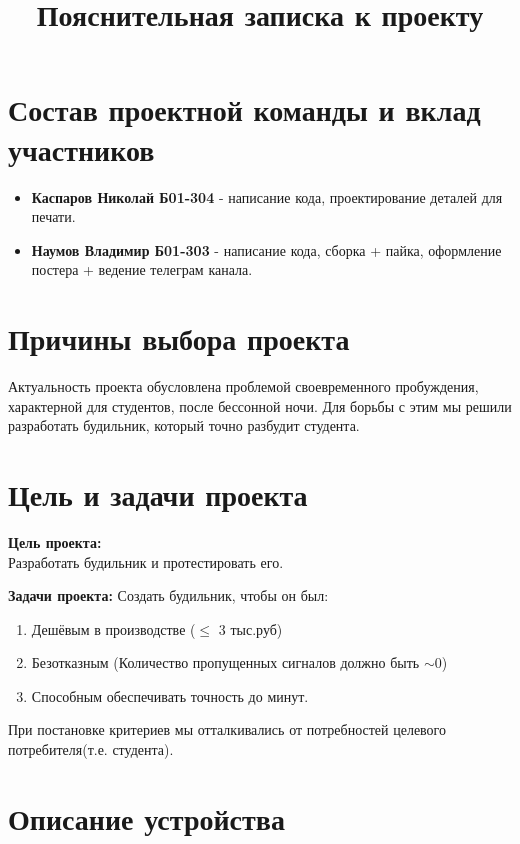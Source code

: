 \documentclass[12pt,a4paper]{article}
\title{Пояснительная записка к проекту}
\date{}
\begin{document}
\maketitle

\section{Состав проектной команды и вклад участников}

\begin{itemize}
    \item \textbf{Каспаров Николай Б01-304} - написание кода, проектирование деталей для печати.
    \item \textbf{Наумов Владимир Б01-303} - написание кода, сборка + пайка, оформление постера + ведение телеграм канала.
\end{itemize}

\section{Причины выбора проекта}

Актуальность проекта обусловлена проблемой своевременного пробуждения, характерной для студентов, после бессонной ночи. Для борьбы с этим мы решили разработать будильник, который точно разбудит студента.

\section{Цель и задачи проекта}

\textbf{Цель проекта:} \\
Разработать будильник и протестировать его.

\textbf{Задачи проекта:}
Создать будильник, чтобы он был:
\begin{enumerate}
    \item Дешёвым в производстве ($\leqslant$ 3 тыс.руб)
    \item Безотказным (Количество пропущенных сигналов должно быть $\sim$0)
    \item Способным обеспечивать точность до минут.
\end{enumerate}
При постановке критериев мы отталкивались от потребностей целевого потребителя(т.е. студента).

\section{Описание устройства}
\end{document}
